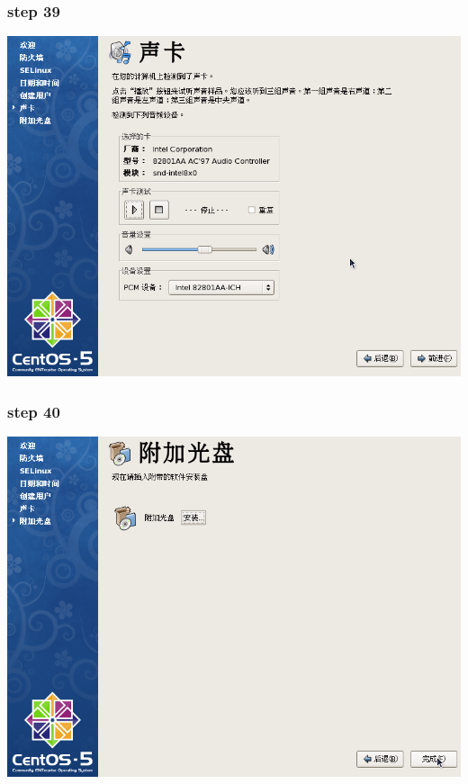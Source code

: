 \documentclass[xcolor=svgnames,presentation]{beamer}
\begin{document}
\begin{frame}
\frametitle{step 39}
\label{sec-2-39}

\begin{center}
\includegraphics[width=.9\linewidth]{img/img61.png}
\end{center}
\end{frame}
\begin{frame}
\frametitle{step 40}
\label{sec-2-40}

\begin{center}
\includegraphics[width=.9\linewidth]{img/img63.png}
\end{center}
\end{frame}
\end{document}
